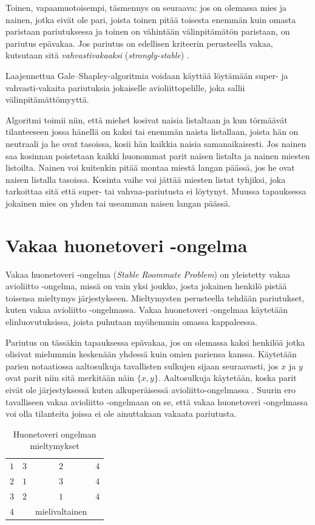 \documentclass[finnish]{tktltiki2}
\theoremstyle{definition}
\theoremstyle{remark}
\begin{document}
Toinen, vapaamuotoisempi, täsmennys on seuraava: jos on olemassa mies ja nainen, jotka eivät ole pari, joista toinen pitää toisesta enemmän kuin omasta paristaan pariutuksessa ja toinen on vähintään välinpitämätön paristaan, on pariutus epävakaa. Jos pariutus on edellisen kriteerin perusteella vakaa, kutsutaan sitä \emph{vahvastivakaaksi} (\emph{strongly-stable}) \cite[s. 29]{gusfield1989stable}.

Laajennettua Gale--Shapley-algoritmia voidaan käyttää löytämään super- ja vahvasti-vakaita pariutuksia jokaiselle avioliittopelille, joka sallii välinpitämättömyyttä.

Algoritmi toimii niin, että miehet kosivat naisia listaltaan ja kun törmäävät tilanteeseen jossa hänellä on kaksi tai enemmän naista listallaan, joista hän on neutraali ja he ovat tasoissa, kosii hän kaikkia naisia samanaikaisesti. Jos nainen saa kosinnan poistetaan kaikki huonommat parit naisen listalta ja nainen miesten listoilta. Nainen voi kuitenkin pitää montaa miestä langan päässä, jos he ovat naisen listalla tasoissa. Kosinta vaihe voi jättää miesten listat tyhjiksi, joka tarkoittaa sitä että super- tai vahvaa-pariutusta ei löytynyt. Muussa tapauksessa jokainen mies on yhden tai useamman naisen langan päässä.

\section{Vakaa huonetoveri -ongelma}
Vakaa huonetoveri -ongelma (\emph{Stable Roommate Problem}) on yleistetty vakaa avioliitto -ongelma, missä on vain yksi joukko, josta jokainen henkilö pistää toisensa mieltymys järjestykseen. Mieltymysten perusteella tehdään pariutukset, kuten vakaa avioliitto -ongelmassa. Vakaa huonetoveri -ongelmaa käytetään elinluovutuksissa, joista puhutaan myöhemmin omassa kappaleessa.

Pariutus on tässäkin tapauksessa epävakaa, jos on olemassa kaksi henkilöä jotka olisivat mielummin keskenään yhdessä kuin omien pariensa kanssa. Käytetään parien notaatiossa aaltosulkuja tavallisten sulkujen sijaan seuraavasti, jos $x$ ja $y$ ovat parit niin sitä merkitään näin $\{x, y\}$. Aaltosulkuja käytetään, koska parit eivät ole järjestyksessä kuten alkuperäisessä avioliitto-ongelmassa \cite[s. 163]{gusfield1989stable}. Suurin ero tavalliseen vakaa avioliitto -ongelmaan on se, että vakaa huonetoveri -ongelmassa voi olla tilanteita joissa ei ole ainuttakaan vakaata pariutusta.

\begin{table}[H]
\begin{center}
	\begin{tabular}{ l | *{2}{c} r }
	 &  \\
	 \hline
 	 $1$ & $3$ & $2$ & $4$ \\
 	 $2$ & $1$ & $3$ & $4$ \\
 	 $3$ & $2$ & $1$ & $4$ \\
 	 $4$ & &mielivaltainen
	\end{tabular}
	\caption{Huonetoveri ongelman mieltymykset \cite[s. 164]{gusfield1989stable}}
	\label{room-table}
\end{center}
\end{table}
\end{document}
